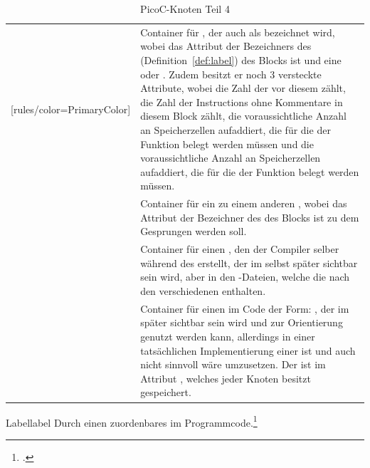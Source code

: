 \begin{table}[H]
\begin{NiceTabular}{X[7]X[10]}[rules/color=PrimaryColor]
   & Container für , der auch als  bezeichnet wird, wobei das Attribut  der Bezeichners des  (Definition~\ref{def:label}) des Blocks ist und  eine  oder . Zudem besitzt er noch $3$ \textcolor{gray!90!black}{versteckte Attribute}, wobei   die Zahl der  vor diesem  zählt,   die Zahl der Instructions ohne Kommentare in diesem Block zählt,  die voraussichtliche Anzahl an Speicherzellen aufaddiert, die für die  der Funktion belegt werden müssen und  die voraussichtliche Anzahl an Speicherzellen aufaddiert, die für die  der Funktion belegt werden müssen. \\
   & Container für ein  zu einem anderen , wobei das Attribut  der Bezeichner des  des Blocks ist zu dem Gesprungen werden soll. \\
   & Container für einen , den der Compiler selber während des  erstellt, der im  selbst später  sichtbar sein wird, aber in den -Dateien, welche die  nach den verschiedenen  enthalten. \\
   & Container für einen  im Code der Form: , der im  später sichtbar sein wird und zur Orientierung genutzt werden kann, allerdings in einer tatsächlichen Implementierung einer   ist und auch nicht sinnvoll wäre umzusetzen. Der  ist im Attribut , welches jeder Knoten besitzt gespeichert. \\
  \bottomrule
\end{NiceTabular}
\caption{PicoC-Knoten Teil 4}
\label{tab:picoc_knoten_teil_4}
\end{table}


\begin{Definition}{Label}{label}
  Durch einen   zuordenbares  im Programmcode.\footcite{tab:picoc_knoten_teil_4}
\end{Definition}

